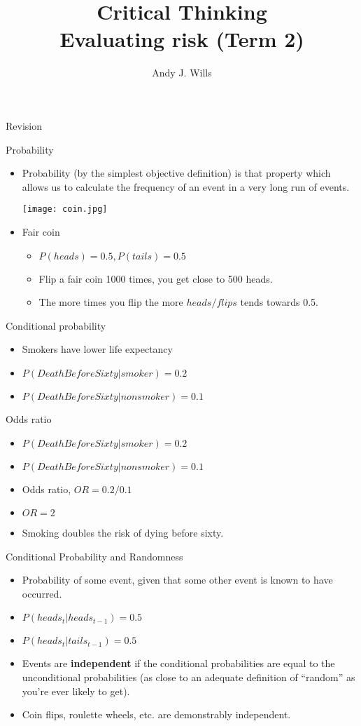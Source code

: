 \documentclass{beamer}
\title[Critical Thinking 6]{Critical Thinking \\Evaluating risk (Term 2)}
\author{Andy J. Wills}
\institute[Plymouth University]{School of Psychology\\Plymouth University, U.K.}
\begin{document}
\frame{\titlepage}

\begin{frame}{Revision}
\end{frame}

\begin{frame}{Probability}
\begin{itemize}
\item Probability (by the simplest objective definition) is that property which allows us to calculate the frequency of an event in a very long run of events.

\centerline{\texttt{[image: coin.jpg]}}
\item Fair coin 
\begin{itemize}
	\item $P(heads) = 0.5, P(tails) = 0.5$
	\item Flip a fair coin 1000 times, you get close to 500 heads.
	\item The more times you flip the more $heads/flips$ tends towards 0.5.
\end{itemize}
\end{itemize}
\end{frame}

\begin{frame}{Conditional probability}
\begin{itemize}
\item Smokers have lower life expectancy
\item $P(DeathBeforeSixty|smoker) = 0.2 $ 
\item $P(DeathBeforeSixty|nonsmoker) = 0.1 $
\end{itemize}
\end{frame}

\begin{frame}{Odds ratio}
\begin{itemize}
\item $P(DeathBeforeSixty|smoker) = 0.2 $ 
\item $P(DeathBeforeSixty|nonsmoker) = 0.1 $ 
\item Odds ratio, $OR = 0.2 / 0.1 $
\item $OR = 2$
\item Smoking doubles the risk of dying before sixty. 
\end{itemize}
\end{frame}

\begin{frame}{Conditional Probability and Randomness}
\begin{itemize}
\item Probability of some event, given that some other event is known to have occurred.
\item $P(heads_{t}|heads_{t-1}) = 0.5$
\item $P(heads_{t}|tails_{t-1}) = 0.5$
\item Events are \textbf{independent} if the conditional probabilities are equal to the unconditional probabilities (as close to an adequate definition of ``random'' as you're ever likely to get).
\item Coin flips, roulette wheels, etc. are demonstrably independent. 
\end{itemize}
\end{frame}
\end{document}
